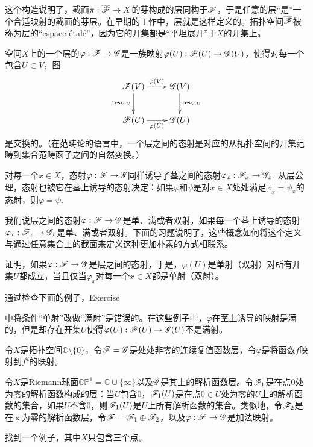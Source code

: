 这个构造说明了，截面$\pi:\overline{\mathscr{F}}\to X$的芽构成的层同构于$\mathscr{F}$，于是任意的层“是”一个合适映射的截面的芽层。在早期的工作中，层就是这样定义的。拓扑空间$\overline{\mathscr{F}}$被称为层的``espace \'{e}tal\'{e}''，因为它的开集都是“平坦展开”于$X$的开集上。

空间$X$上的一个层的$\varphi:\mathscr{F}\to\mathscr{G}$是一族映射$\varphi(U):\mathscr{F}(U)\to \mathscr{G}(U)$，使得对每一个包含$U\subset V$，图
\[
	\xymatrix{
	\ff(V)\ar[r]^{\varphi(V)}\ar[d]_{\res_{V,U}}&\scrg(V)\ar[d]^{\res_{V,U}}\\
	\ff(U)\ar[r]_{\varphi(U)}&\scrg(U)
	}
\]
是交换的。（在范畴论的语言中，一个层之间的态射是对应的从拓扑空间的开集范畴到集合范畴函子之间的自然变换。）

对每一个$x\in X$，态射$\varphi:\mathscr{F}\to\mathscr{G}$同样诱导了茎之间的态射$\varphi_x:\mathscr{F}_x\to\mathscr{G}_x$. 从层公理，态射也被它在茎上诱导的态射决定：如果$\varphi$和$\psi$是对$x\in X$处处满足$\varphi_x=\psi_x$的态射，则$\varphi=\psi$.

我们说层之间的态射$\varphi:\mathscr{F}\to\mathscr{G}$是单、满或者双射，如果每一个茎上诱导的态射$\varphi_x:\mathscr{F}_x\to\mathscr{G}_x$是单、满或者双射。下面的习题说明了，这些概念如何将这个定义与通过任意集合上的截面来定义这种更加朴素的方式相联系。

\begin{exe}
	证明，如果$\varphi:\mathscr{F}\to\mathscr{G}$是层之间的态射，于是，$\varphi(U)$是单射（双射）对所有开集$U$都成立，当且仅当$\varphi_x$对每一个$x\in X$都是单射（双射）。
\end{exe}

\begin{exe}
	通过检查下面的例子，Exercise {{\addtocounter{thm}{-1}}\thethm{\addtocounter{thm}{1}}}中将条件“单射”改做“满射”是错误的。在这些例子中，$\varphi$在茎上诱导的映射是满的，但是却存在开集$U$使得$\varphi(U):\mathscr{F}(U)\to \mathscr{G}(U)$不是满射。
	\begin{compactenum}[(a)]
	\item 令$X$是拓扑空间$\mathbb{C}\setminus \{0\}$，令$\mathscr{F}=\mathscr{G}$是处处非零的连续复值函数层，令$\varphi$是将函数$f$映射到$f^2$的映射。

	\item 令$X$是Riemann球面$\mathbb{CP}^1=\mathbb{C}\cup\{\infty\}$以及$\mathscr{G}$是其上的解析函数层。令$\mathscr{F}_1$是在点$0$处为零的解析函数构成的层：当$U$包含$0$，$\mathscr{F}_1(U)$是在点$0\in U$处为零的$U$上的解析函数的集合，如果$U$不含$0$，则$\mathscr{F}_1(U)$是$U$上所有解析函数的集合。类似地，令$\mathscr{F}_2$是在$\infty$为零的解析函数层，令$\mathscr{F}=\mathscr{F}_1\oplus\mathscr{F}_2$，以及$\varphi:\mathscr{F}\to\mathscr{G}$是加法映射。

	\item 找到一个例子，其中$X$只包含三个点。
	\end{compactenum}
\end{exe}

